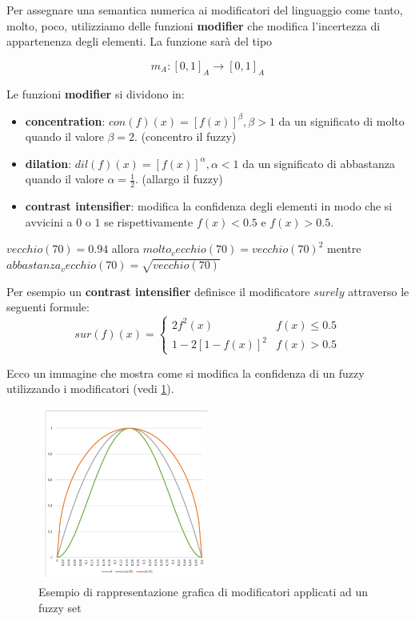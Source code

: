 Per assegnare una semantica numerica ai modificatori del linguaggio come tanto, molto,
poco, utilizziamo delle funzioni \textbf{modifier} che modifica l'incertezza di appartenenza degli 
elementi. La funzione sarà del tipo

$$m_A: [0,1]_A \to [0,1]_A$$

Le funzioni \textbf{modifier} si dividono in:
\begin{itemize}
    \item \textbf{concentration}: $con(f)(x)=[f(x)]^\beta, \beta>1$ da un significato di molto 
    quando il valore $\beta =2$. (concentro il fuzzy)
    \item \textbf{dilation}:  $dil(f)(x)=[f(x)]^\alpha, \alpha <1$ da un significato di abbastanza
    quando il valore $\alpha =\frac{1}{2}$. (allargo il fuzzy)
    \item \textbf{contrast intensifier}: modifica la confidenza degli elementi in modo 
    che si avvicini a $0$ o $1$ se rispettivamente $f(x)< 0.5$ e $f(x) >0.5$.
\end{itemize}

\begin{esempio}
    $vecchio(70)=0.94$ allora $molto_vecchio (70) = vecchio(70)^2$
    mentre $abbastanza_vecchio (70) = \sqrt{vecchio(70)}$
\end{esempio}

\begin{esempio}
    Per esempio un \textbf{contrast intensifier} definisce il modificatore $surely$
    attraverso le seguenti formule:
    $$sur(f)(x)=\begin{cases}
        2f^2(x) & f(x) \le 0.5\\
        1-2[1-f(x)]^2 & f(x) > 0.5
    \end{cases}$$
\end{esempio}

Ecco un immagine che mostra come si modifica la confidenza di un fuzzy utilizzando 
i modificatori (vedi \ref{fig:modificatori_fuzzy_set}).

\begin{figure}[!ht]
    \centering
    \includegraphics[width=0.5\textwidth]{img/sistemi_incerti/modificatori_fuzzy.png}
    \caption{Esempio di rappresentazione grafica di modificatori applicati ad un fuzzy set}
    \label{fig:modificatori_fuzzy_set}
\end{figure}  

